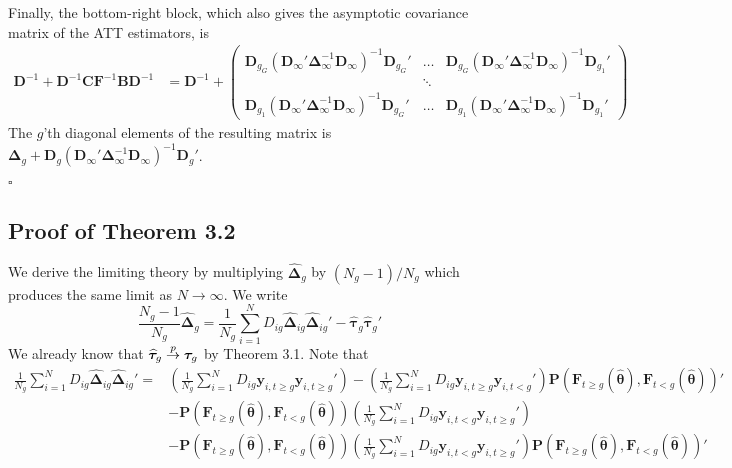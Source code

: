 \documentclass[12pt]{article}
\begin{document}
Finally, the bottom-right block, which also gives the asymptotic covariance matrix of the ATT estimators, is 
\begin{align*}
    \bm D^{-1} + \bm D^{-1} \bm C \bm F^{-1} \bm B \bm D^{-1} 
    &= \bm D^{-1} + 
    \begin{pmatrix}
        \bm D_{g_G} (\bm D_{\infty}' \bm \Delta_{\infty}^{-1} \bm D_{\infty})^{-1} \bm D_{g_G}' & \hdots & \bm D_{g_G} (\bm D_{\infty}' \bm \Delta_{\infty}^{-1} \bm D_{\infty})^{-1} \bm D_{g_1}'\\
        & \ddots &\\
        \bm D_{g_1} (\bm D_{\infty}' \bm \Delta_{\infty}^{-1} \bm D_{\infty})^{-1} \bm D_{g_G}' & \hdots & \bm D_{g_1} (\bm D_{\infty}' \bm \Delta_{\infty}^{-1} \bm D_{\infty})^{-1} \bm D_{g_1}'
    \end{pmatrix}
\end{align*}
The $g$'th diagonal elements of the resulting matrix is $\bm \Delta_g + \bm D_g (\bm D_{\infty}' \bm \Delta_{\infty}^{-1} \bm D_{\infty})^{-1} \bm D_g'$.

$\square$




\subsection*{Proof of Theorem 3.2}

We derive the limiting theory by multiplying $\widehat{\bm \Delta}_g$ by $(N_g-1)/N_g$ which produces the same limit as $N \rightarrow \infty$. We write
\begin{equation*}
    \frac{N_g - 1}{ N_g} \widehat{\bm \Delta}_g = \frac{1}{N_g} \sum_{i = 1}^N D_{ig} \widehat{\bm \Delta}_{ig} \widehat{\bm \Delta}_{ig}' - \widehat{\bm \tau}_g \widehat{\bm \tau}_g'
\end{equation*}
We already know that $\widehat{\bm \tau}_g \stackrel{p}{\rightarrow} \bm \tau_g$ by Theorem 3.1. Note that 
\begin{align*}
    \frac{1}{N_g} \sum_{i = 1}^N D_{ig} \widehat{\bm \Delta}_{ig} \widehat{\bm \Delta}_{ig}' = &\left( \frac{1}{N_g} \sum_{i = 1}^N D_{ig}  \bm y_{i, t \geq g} \bm y_{i, t \geq g}' \right) - \left( \frac{1}{N_g} \sum_{i = 1}^N D_{ig} \bm y_{i, t \geq g} \bm y_{i, t < g}' \right) \bm P(\bm F_{t \geq g}(\widehat{\bm \theta}), \bm F_{t < g}(\widehat{\bm \theta}))'\\
    &- \bm P(\bm F_{t \geq g}(\widehat{\bm \theta}), \bm F_{t < g}(\widehat{\bm \theta})) \left( \frac{1}{N_g} \sum_{i = 1}^N D_{ig} \bm y_{i, t < g} \bm y_{i, t \geq g}' \right)\\
    &- \bm P(\bm F_{t \geq g}(\widehat{\bm \theta}), \bm F_{t < g}(\widehat{\bm \theta})) \left( \frac{1}{N_g} \sum_{i = 1}^N D_{ig}  \bm y_{i, t < g} \bm y_{i, t \geq g}' \right) \bm P(\bm F_{t \geq g}(\widehat{\bm \theta}), \bm F_{t < g}(\widehat{\bm \theta}))'
\end{align*} 
\end{document}
